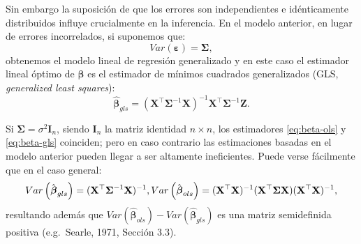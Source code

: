 \documentclass[
  spanish,
]{book}
\theoremstyle{break}
\theoremstyle{definition}
\theoremstyle{definition}
\theoremstyle{definition}
\theoremstyle{definition}
\theoremstyle{remark}
\begin{document}
Sin embargo la suposición de que los errores son independientes e idénticamente distribuidos influye crucialmente en la inferencia.
En el modelo anterior, en lugar de errores incorrelados, si suponemos que:
\[Var\left( \boldsymbol{\varepsilon} \right) =\boldsymbol{\Sigma},\]
obtenemos el modelo lineal de regresión generalizado y en este caso el estimador lineal óptimo de \(\boldsymbol{\beta}\) es el estimador de mínimos cuadrados generalizados (GLS, \emph{generalized least squares}):
\begin{equation} 
  \hat{\boldsymbol{\beta}}_{gls} =(\mathbf{X}^{\top}\boldsymbol{\Sigma}^{-1} \mathbf{X})^{-1} \mathbf{X}^{\top}\boldsymbol{\Sigma}^{-1} \mathbf{Z}.
  \label{eq:beta-gls}
\end{equation}

Si \(\boldsymbol{\Sigma}=\sigma^{2} \mathbf{I}_{n}\), siendo \(\mathbf{I}_{n}\) la matriz identidad \(n\times n\), los estimadores \eqref{eq:beta-ols} y \eqref{eq:beta-gls} coinciden; pero en caso contrario las estimaciones basadas en el modelo anterior pueden llegar a ser altamente ineficientes.
Puede verse fácilmente que en el caso general:
\[Var\left( \hat{\boldsymbol{\beta}}_{gls} \right)=(\mathbf{X}^{\top}\boldsymbol{\Sigma}^{-1} \mathbf{X})^{-1}, \\
Var\left( \hat{\boldsymbol{\beta}}_{ols} \right) =(\mathbf{X}^{\top}\mathbf{X})^{-1} (\mathbf{X}^{\top}\boldsymbol{\Sigma}\mathbf{X})(\mathbf{X}^{\top}\mathbf{X})^{-1},\]
resultando además que \(Var( \hat{\boldsymbol{\beta}}_{ols}) - Var( \hat{\boldsymbol{\beta}}_{gls} )\) es una matriz semidefinida positiva (e.g.~Searle, 1971, Sección 3.3).
\end{document}
